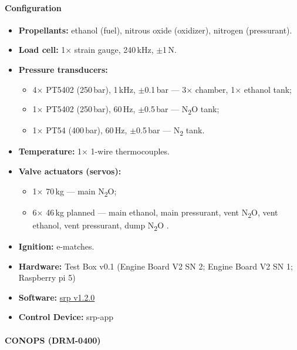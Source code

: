\paragraph{Configuration}
\begin{itemize}
  \item \textbf{Propellants:} ethanol (fuel), nitrous oxide (oxidizer), nitrogen
    (pressurant).
  \item \textbf{Load cell:} 1$\times$ strain gauge, 240\,kHz, $\pm$1\,N.
  \item \textbf{Pressure transducers:}
    \begin{itemize}
      \item 4$\times$ PT5402 (250\,bar), 1\,kHz, $\pm$0.1\,bar --- 3$\times$
        chamber, 1$\times$ ethanol tank;
      \item 1$\times$ PT5402 (250\,bar), 60\,Hz, $\pm$0.5\,bar --- N\textsubscript{2}O
        tank;
      \item 1$\times$ PT54 (400\,bar), 60\,Hz, $\pm$0.5\,bar --- N\textsubscript{2}
        tank.
    \end{itemize}
  \item \textbf{Temperature:} 1$\times$ 1-wire thermocouples.
  \item \textbf{Valve actuators (servos):}
    \begin{itemize}
      \item 1$\times$ 70\,kg --- main N\textsubscript{2}O;
      \item 6$\times$ 46\,kg planned --- main ethanol, main pressurant, vent
        N\textsubscript{2}O, vent ethanol, vent pressurant, dump N\textsubscript{2}O
        .
    \end{itemize}
  \item \textbf{Ignition:} e-matches.
  \item \textbf{Hardware:} Test Box v0.1 (Engine Board V2 SN 2; Engine Board V2 SN 1; Raspberry pi 5)
  \item \textbf{Software:} \href{https://github.com/Simba-Avionic/srp/releases/tag/v1.2.0}{srp v1.2.0}
  \item \textbf{Control Device:} srp-app
\end{itemize}

\paragraph{CONOPS (DRM-0400)}


